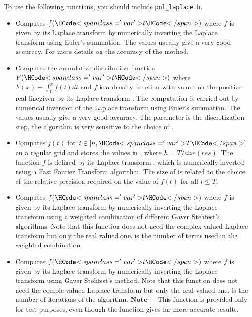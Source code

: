To use the following functions, you should include \verb!pnl_laplace.h!.

\begin{itemize}
\item {}
  \sshortdescribe Computes $f(\var{t})$ where $f$ is given by its Laplace
  transform  by numerically inverting the Laplace transform using
  Euler's summation. The values  usually give a very good
  accuracy. For more details on the accuracy of the method.

\item {}
  \sshortdescribe Computes the cumulative distribution function $F(\var{t})$
  where $F(x) = \int_0^x f(t) dt$ and $f$ is a density function with values on
  the positive real linegiven by its Laplace transform . The
  computation is carried out by numerical inversion of the Laplace transform
  using Euler's summation. The values  usually give a very
  good accuracy. The parameter  is the discretization step, the
  algorithm is very sensitive to the choice of .

\item {}
  \sshortdescribe Computes $f(t)$ for $t \in [h, \var{T}]$ on a regular grid
  and stores the values in , where $h = T / {\mathrm size}(res)$. The
  function $f$ is defined by its Laplace transform , which is
  numerically inverted using a Fast Fourier Transform algorithm. The size of
   is related to the choice of the relative precision 
  required on the value of $f(t)$ for all $t \le T$.

\item {}
  \sshortdescribe Computes $f(\var{t})$ where $f$ is given by its Laplace
  transform  by numerically inverting the Laplace transform using a
  weighted combination of different Gaver Stehfest's algorithms. Note that
  this function does not need the complex valued Laplace transform but only the
  real valued one.  is the number of terms used in the weighted combination.

\item {}
  \sshortdescribe Computes $f(\var{t})$ where $f$ is given by its Laplace
  transform  by numerically inverting the Laplace transform using
  Gaver Stehfest's method. Note that this function does not
  need the comple valued Laplace transform but only the real valued
  one.  is the number of iterations of the algorithm.
  {\bf Note : }~This function is provided only for test purposes, even though
  the function  gives far more accurate results.
\end{itemize}

